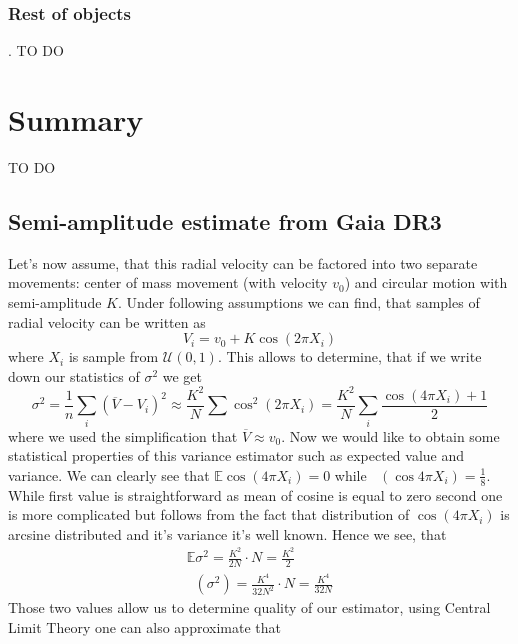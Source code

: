 \documentclass{pracalicmgr}
\DeclareMathOperator{\Var}{\widehat{Var}}
\begin{document}
\subsection{Rest of objects}.
TO DO

\chapter{Summary}
TO DO
 

\begin{appendices}
    \chapter{Semi-amplitude estimate from Gaia DR3}
    Let's now assume, that this radial velocity can be factored into two separate movements: center of mass movement (with velocity $v_0$) and circular motion with semi-amplitude $K$. Under following 
assumptions we can find, that samples of radial velocity can be written as 
\begin{equation}
    V_i=v_0+K\cos{(2\pi X_i)}
\end{equation}
where $X_i$ is sample from $\mathcal{U}(0,1)$. This allows to determine, that if we write down our statistics of $\sigma^2$ we get 
\begin{equation}
    \sigma^2=\frac{1}{n}\sum_i (\overline{V}-V_i)^2\approx \frac{K^2}{N}\sum \cos^2{(2\pi X_i)}=\frac{K^2}{N}\sum_i \frac{\cos{(4\pi X_i)}+1}{2}
\end{equation}
where we used the simplification that $\overline{V}\approx v_0$. Now we would like to obtain some statistical properties of this variance estimator such as expected value and variance.
We can clearly see that $\mathbb{E}\cos{(4\pi X_i)}=0$ while $\Var(\cos{4\pi X_i})=\frac{1}{8}$. While first value is straightforward as mean of cosine is equal to zero second one 
is more complicated but follows from the fact that distribution of $\cos{(4\pi X_i)}$ is arcsine distributed and it's variance it's well known. Hence we see, that 
\begin{align}\label{semi}
    \mathbb{E} \sigma^2 = \frac{K^2}{2N}\cdot N = \frac{K^2}{2}\\ 
    \Var (\sigma^2) = \frac{K^4}{32N^2}\cdot N = \frac{K^4}{32N}
\end{align} 
Those two values allow us to determine quality of our estimator, using Central Limit Theory one can also approximate that 

\end{appendices}
\end{document}
